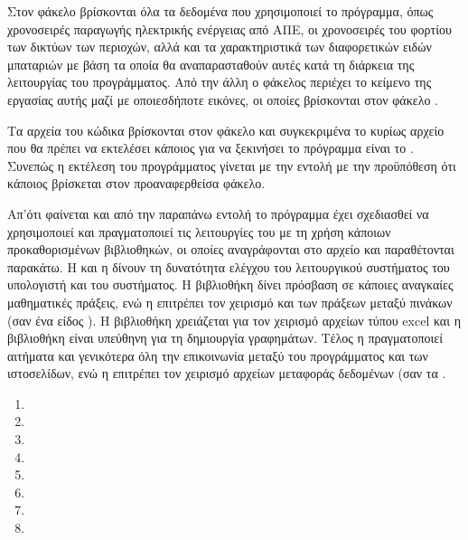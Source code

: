 \documentclass[12pt]{report}
\begin{document}
Στον φάκελο {} βρίσκονται όλα τα δεδομένα που χρησιμοποιεί το πρόγραμμα, όπως χρονοσειρές παραγωγής ηλεκτρικής ενέργειας από ΑΠΕ, οι χρονοσειρές του φορτίου των δικτύων των περιοχών, αλλά και τα χαρακτηριστικά των
διαφορετικών ειδών μπαταριών με βάση τα οποία θα αναπαρασταθούν αυτές κατά τη διάρκεια της λειτουργίας του προγράμματος. Από την άλλη ο φάκελος {} περιέχει το κείμενο της εργασίας αυτής μαζί με οποιεσδήποτε εικόνες, οι
οποίες βρίσκονται στον φάκελο {}.

Τα αρχεία του κώδικα βρίσκονται στον φάκελο {} και συγκεκριμένα το κυρίως αρχείο που θα πρέπει να εκτελέσει κάποιος για να ξεκινήσει το πρόγραμμα είναι το {}. Συνεπώς η εκτέλεση του προγράμματος γίνεται με την εντολή {} με την προϋπόθεση ότι κάποιος βρίσκεται στον προαναφερθείσα φάκελο.

Απ'ότι φαίνεται και από την παραπάνω εντολή το πρόγραμμα έχει σχεδιασθεί να χρησιμοποιεί {} και πραγματοποιεί τις λειτουργίες του με τη χρήση κάποιων προκαθορισμένων βιβλιοθηκών, οι οποίες αναγράφονται στο 
αρχείο {} και παραθέτονται παρακάτω. Η {} και η {} δίνουν τη δυνατότητα ελέγχου του λειτουργικού συστήματος του υπολογιστή και του συστήματος. Η βιβλιοθήκη {}
δίνει πρόσβαση σε κάποιες αναγκαίες μαθηματικές πράξεις, ενώ η {} επιτρέπει τον χειρισμό και των πράξεων μεταξύ πινάκων (σαν ένα είδος {}). Η βιβλιοθήκη {} χρειάζεται για τον
χειρισμό αρχείων τύπου excel και η βιβλιοθήκη {} είναι υπεύθηνη για τη δημιουργία γραφημάτων. Τέλος η {} πραγματοποιεί αιτήματα και γενικότερα όλη την επικοινωνία μεταξύ του προγράμματος
και των ιστοσελίδων, ενώ η {} επιτρέπει τον χειρισμό αρχείων μεταφοράς δεδομένων {} (σαν τα {}.

\begin{multicols}{4}
\begin{enumerate}[label=\roman*.]
				\item {}
				\item {}
				\item {}
				\item {}
				\item {}
				\item {}
				\item {}
				\item {}
\end{enumerate}
\end{multicols}
\end{document}
